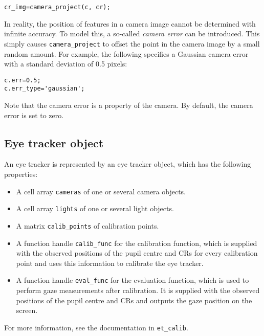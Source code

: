 \documentclass{scrartcl}
\begin{document}
\begin{verbatim}
cr_img=camera_project(c, cr);
\end{verbatim}

In reality, the position of features in a camera image cannot be determined
with infinite accuracy. To model this, a so-called \emph{camera error} can be
introduced. This simply causes \texttt{camera\_project} to offset the point in
the camera image by a small random amount. For example, the following
specifies a Gaussian camera error with a standard deviation of 0.5 pixels:

\begin{verbatim}
c.err=0.5;
c.err_type='gaussian';
\end{verbatim}

Note that the camera error is a property of the camera. By default, the camera
error is set to zero.

\subsection*{Eye tracker object}

An eye tracker is represented by an eye tracker object, which has the
following properties:

\begin{itemize}
\item A cell array \texttt{cameras} of one or several camera objects.

\item A cell array \texttt{lights} of one or several light objects.

\item A matrix \texttt{calib\_points} of calibration points.

\item A function handle \texttt{calib\_func} for the calibration function,
which is supplied with the observed positions of the pupil centre and CRs for
every calibration point and uses this information to calibrate the eye
tracker.

\item A function handle \texttt{eval\_func} for the evaluation function, which
is used to perform gaze measurements after calibration. It is supplied with
the observed positions of the pupil centre and CRs and outputs the gaze
position on the screen.
\end{itemize}

For more information, see the documentation in \texttt{et\_calib}.
\end{document}

